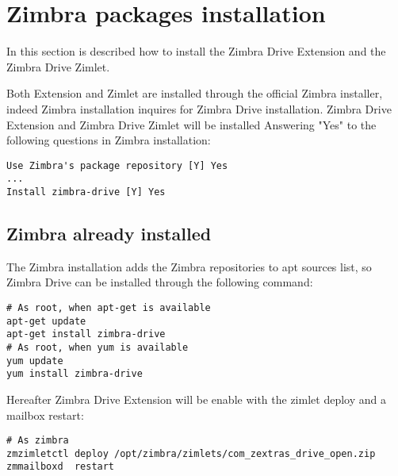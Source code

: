 \section{Zimbra packages installation}

In this section is described how to install the Zimbra Drive Extension and the Zimbra Drive Zimlet.

Both Extension and Zimlet are installed through the official Zimbra installer,
indeed Zimbra installation inquires for Zimbra Drive installation.
Zimbra Drive Extension and Zimbra Drive Zimlet will be installed Answering
"Yes" to the following questions in Zimbra installation:

\begin{verbatim}
Use Zimbra's package repository [Y] Yes
...
Install zimbra-drive [Y] Yes
\end{verbatim}

\subsection{Zimbra already installed}

The Zimbra installation adds the Zimbra repositories to apt sources list,
so Zimbra Drive can be installed through the following command:

\begin{verbatim}
# As root, when apt-get is available
apt-get update
apt-get install zimbra-drive
# As root, when yum is available
yum update
yum install zimbra-drive
\end{verbatim}

Hereafter Zimbra Drive Extension will be enable with the zimlet deploy and a mailbox restart:

\begin{verbatim}
# As zimbra
zmzimletctl deploy /opt/zimbra/zimlets/com_zextras_drive_open.zip
zmmailboxd  restart
\end{verbatim}
